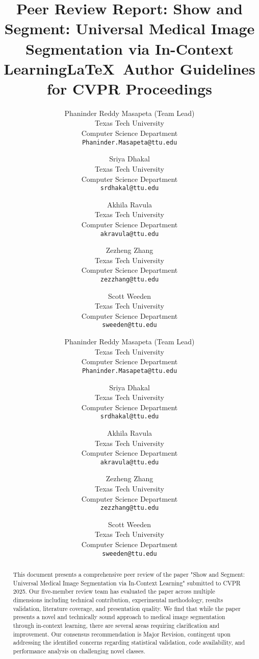 \documentclass[10pt,twocolumn,letterpaper]{article}
\title{Peer Review Report: Show and Segment: Universal Medical Image Segmentation via In-Context Learning}
\author{Phaninder Reddy Masapeta (Team Lead)\\
Texas Tech University\\
Computer Science Department\\
{\tt\small Phaninder.Masapeta@ttu.edu}
\and
Sriya Dhakal\\
Texas Tech University\\
Computer Science Department\\
{\tt\small srdhakal@ttu.edu}
\and
Akhila Ravula\\
Texas Tech University\\
Computer Science Department\\
{\tt\small akravula@ttu.edu}
\and
Zezheng Zhang\\
Texas Tech University\\
Computer Science Department\\
{\tt\small zezzhang@ttu.edu}
\and
Scott Weeden\\
Texas Tech University\\
Computer Science Department\\
{\tt\small sweeden@ttu.edu}
}
\begin{document}
\title{\LaTeX\ Author Guidelines for CVPR Proceedings}

\author{Phaninder Reddy Masapeta (Team Lead)\\
Texas Tech University\\
Computer Science Department\\
{\tt\small Phaninder.Masapeta@ttu.edu}
\and
Sriya Dhakal\\
Texas Tech University\\
Computer Science Department\\
{\tt\small srdhakal@ttu.edu}
\and
Akhila Ravula\\
Texas Tech University\\
Computer Science Department\\
{\tt\small akravula@ttu.edu}
\and
Zezheng Zhang\\
Texas Tech University\\
Computer Science Department\\
{\tt\small zezzhang@ttu.edu}
\and
Scott Weeden\\
Texas Tech University\\
Computer Science Department\\
{\tt\small sweeden@ttu.edu}
}

\maketitle

\begin{abstract}
This document presents a comprehensive peer review of the paper "Show and Segment: Universal Medical Image Segmentation via In-Context Learning" submitted to CVPR 2025. Our five-member review team has evaluated the paper across multiple dimensions including technical contribution, experimental methodology, results validation, literature coverage, and presentation quality. We find that while the paper presents a novel and technically sound approach to medical image segmentation through in-context learning, there are several areas requiring clarification and improvement. Our consensus recommendation is Major Revision, contingent upon addressing the identified concerns regarding statistical validation, code availability, and performance analysis on challenging novel classes.
\end{abstract}


\end{document}

